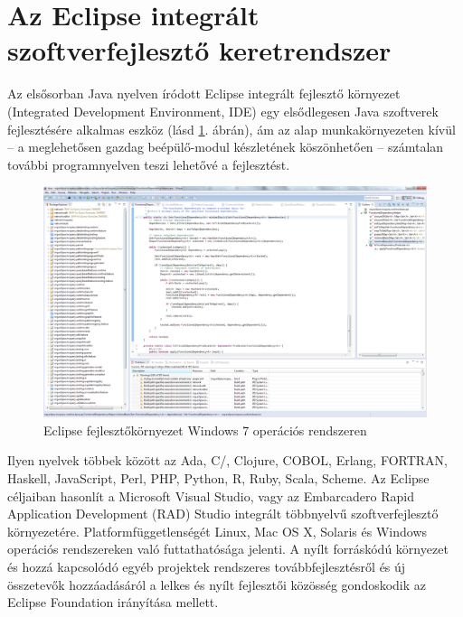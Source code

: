 
\section{Az Eclipse integrált szoftverfejlesztő keretrendszer}

Az elsősorban Java nyelven íródott Eclipse integrált fejlesztő környezet (Integrated Development Environment, IDE) egy elsődlegesen Java szoftverek fejlesztésére alkalmas eszköz (lásd \ref{fig:EclipseIDE}. ábrán), ám az alap munkakörnyezeten kívül -- a meglehetősen gazdag beépülő-modul készletének köszönhetően -- számtalan további programnyelven teszi lehetővé a fejlesztést.
%
\begin{figure}[hbt]
\centering
\includegraphics[width=\textwidth]{figures/eclipse-ide.png}
\caption{Eclipse fejlesztőkörnyezet Windows 7 operációs rendszeren}
\label{fig:EclipseIDE}
\end{figure}
%
Ilyen nyelvek többek között az Ada, C/\CPP, Clojure, COBOL, Erlang, FORTRAN, Haskell, JavaScript, Perl, PHP, Python, R, Ruby, Scala, Scheme.
Az Eclipse céljaiban hasonlít a Microsoft Visual Studio, vagy az Embarcadero Rapid Application Development (RAD) Studio integrált többnyelvű szoftverfejlesztő környezetére.
Platformfüggetlenségét Linux, Mac OS X, Solaris és Windows operációs rendszereken való futtathatósága jelenti.
A nyílt forráskódú környezet és hozzá kapcsolódó egyéb projektek rendszeres továbbfejlesztésről és új összetevők hozzáadásáról a lelkes és nyílt fejlesztői közösség  gondoskodik az Eclipse Foundation irányítása mellett.

